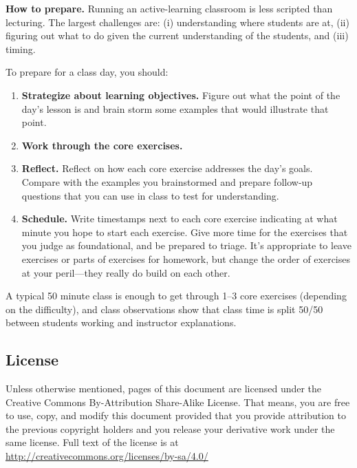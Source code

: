 {\bf How to prepare.}
Running an active-learning classroom is less scripted than lecturing.
The largest challenges are: (i) understanding where students are at, (ii) figuring out what to do given the current understanding of the students, and (iii) timing.

To prepare for a class day, you should:
\begin{enumerate}
	\item {\bf Strategize about learning objectives.} Figure out what the point of the day's lesson is and brain storm some examples that would illustrate that point.
	\item {\bf Work through the core exercises.} 
	\item {\bf Reflect.} Reflect on how each core exercise addresses the day's goals. Compare with the examples you brainstormed and prepare follow-up questions that you can use in class to test for understanding.
	\item {\bf Schedule.} Write timestamps next to each core exercise indicating at what minute you hope to start each exercise. Give more time for the exercises that you judge as foundational, and be prepared to triage. It's appropriate to leave exercises or parts of exercises for homework, but change the order	of exercises at your peril---they really do build on each other.
\end{enumerate}

A typical 50 minute class is enough to get through 1--3 core exercises (depending on the difficulty), and class observations show that class time is split 50/50 between students working and instructor explanations.

\subsection*{License}
Unless otherwise mentioned, pages of this document are licensed under
the Creative Commons By-Attribution Share-Alike License. That means, you are free
to use, copy, and modify this document provided that you provide attribution to the
previous copyright holders and you release your derivative work under the same license.
Full text of the license is at \url{http://creativecommons.org/licenses/by-sa/4.0/}

